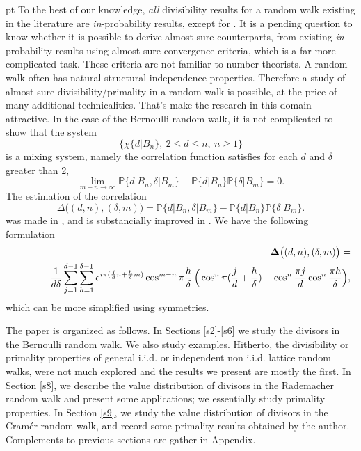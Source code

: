 \documentclass[11pt,draft,reqno]{amsart}
\theoremstyle{definition}
\theoremstyle{remarks}
\numberwithin{equation}{section}
\def \d{{\delta}}
\def \qq{{\qquad}}
\def\P{{\mathcal P}}
\def\P{{\mathbb P}}
\begin{document}
 pt To the best of our knowledge, {\it all}     divisibility results for a random walk existing in the literature are {\it in}-probability results, except for \cite{W6}. It is a pending question to know whether it is possible to derive almost sure   counterparts, from existing {\it in}-probability results using almost sure convergence criteria, which is a far more complicated task.     These criteria are   not  familiar to number theorists. 
A random walk  often has   natural  structural independence properties. Therefore  a study of almost sure divisibility/primality  in a random walk is possible, at the price of many additional technicalities. That's make the research in this domain  attractive. In the case of the Bernoulli random walk, it is not complicated to show   that   the system 
 $$ \big\{ \chi\{d|B_n\},    \    2\le d\le n,\ n\ge 1\big\}$$
is a mixing system, namely        the   correlation
function   satisfies for each     $d$ and $\d$ greater than 2, 
 \begin{equation}
 \label{delta.def.lim}
  \lim_{m-n\to \infty }  \P\big\{ d|B_n  ,    \d|B_m\big\}-\P \{ d|B_n \}\P \{    
\d|B_m \}= 0.
\end{equation}
The estimation of the correlation 
 \begin{equation}
 \label{delta.def}
  {\Delta} \big( (d,n), (\d, m)\big)= \P\big\{ d|B_n  ,   \d|B_m\big\}-\P \{ d|B_n \}\P \{    
\d|B_m \}.
\end{equation}
  was made in \cite{W4},   and is substancially improved in    
  \cite{W14}. We have the following formulation
  \begin{eqnarray}\label{6.4}& & {\bf \Delta} \big( (d,n),  (\d, m)\big)  =
\cr & &\qq \quad{1\over d\d}  \sum_{j=1}^{d-1}\sum_{h=1}^{\d-1}  e^{ i\pi  (  {j\over d}n +   {h\over \d}m) }  \cos^{m-n}{ \pi   {h\over
\d} }\, \Big(\cos^n{ \pi  (  {j\over d} +  
{h\over \d})   }-\cos^{n} {
\pi j\over d}     \cos^{n} {
\pi h\over \d}\Big),
 \end{eqnarray}  
which   can be more simplified    using symmetries.



\medskip  \par

The paper is organized as follows. In Sections \ref{s2}-\ref{s6} we  study the divisors in the Bernoulli random walk. We also study examples. Hitherto, the   divisibility or primality properties of general   i.i.d.   or independent non i.i.d. lattice   random walks, were not much explored and the results we present are mostly the first. In Section \ref{s8}, we describe the value distribution of divisors in the Rademacher random walk and present some applications; we essentially study primality properties. In Section \ref{s9}, we study the value distribution of divisors in the Cram\'er random walk, and record some primality   results obtained by the author. Complements to previous sections are gather in Appendix.
\end{document}
